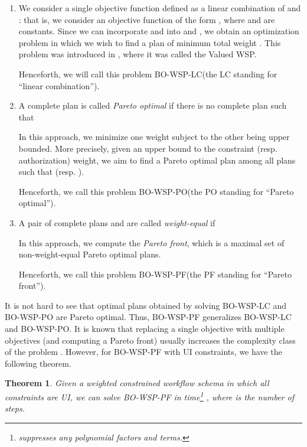 \documentclass[jcs,crcready]{iosart1c}
\newtheorem{thm}{Theorem}
\newcommand{\BOWSPLC}{\textsc{BO-WSP-LC}\xspace}
\newcommand{\BOWSPPO}{\textsc{BO-WSP-PO}\xspace}
\newcommand{\BOWSPPF}{\textsc{BO-WSP-PF}\xspace}
\begin{document}
\begin{enumerate}
\item We consider a single objective function defined as a linear combination of  and :  that is, we consider an objective function of the form , where  and  are constants. Since we can incorporate  and  into  and , we obtain an optimization problem in which we wish to find a plan  of minimum total weight . This problem was introduced in \cite{CrGuKa15}, where it was called the {\sc Valued WSP}.  

Henceforth, we will call this problem \BOWSPLC (the LC standing for ``linear combination'').
\item A complete plan  is called {\em Pareto optimal} if there is no complete plan  such that 
 
In this approach, we minimize one weight subject to the other being upper bounded.
More precisely, given an upper bound  to the constraint (resp. authorization) weight, we aim to find a Pareto optimal plan among all plans  such that  (resp. ).

Henceforth, we call this problem \BOWSPPO (the PO standing for ``Pareto optimal'').
\item  A pair of complete plans  and  are called {\em weight-equal} if 
  
In this approach, we compute the {\em Pareto front}, which is a maximal set of non-weight-equal Pareto optimal plans.

Henceforth, we call this problem \BOWSPPF (the PF standing for ``Pareto front'').
\end{enumerate}


It is not hard to see that optimal plans obtained by solving \BOWSPLC and \BOWSPPO are Pareto optimal.
Thus, \BOWSPPF generalizes \BOWSPLC and \BOWSPPO. 
It is known that replacing a single objective with multiple objectives (and computing a Pareto front) usually increases the complexity class of the problem \cite{Miet}. 
However, for \BOWSPPF with UI constraints, we have the following theorem.

\begin{thm}\label{thm1} Given a weighted constrained workflow schema  in which all constraints are UI, we can solve \BOWSPPF in time\footnote{ suppresses any polynomial factors and terms.} , where  is the number of steps.
\end{thm}
\end{document}
